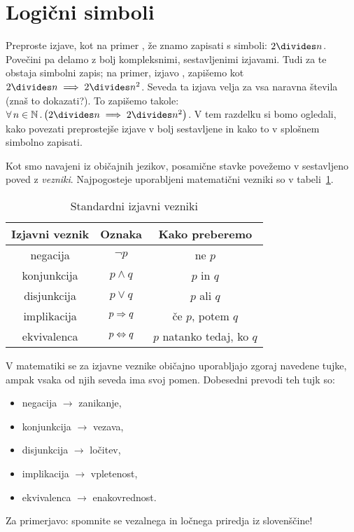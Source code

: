 \section{Logični simboli}\label{razdelek:logicni-simboli}

Preproste izjave, kot na primer , že znamo zapisati s simboli: $2 \divides n$. Povečini pa delamo z bolj kompleksnimi, sestavljenimi izjavami. Tudi za te obstaja simbolni zapis; na primer, izjavo , zapišemo kot $2 \divides n \implies 2 \divides n^2$. Seveda ta izjava velja za vsa naravna števila (znaš to dokazati?). To zapišemo takole: $\all{n}[\NN]{2 \divides n \implies 2 \divides n^2}$. V tem razdelku si bomo ogledali, kako povezati preprostejše izjave v bolj sestavljene in kako to v splošnem simbolno zapisati.

Kot smo navajeni iz običajnih jezikov, posamične stavke povežemo v sestavljeno poved z \emph{vezniki}. Najpogosteje uporabljeni matematični vezniki so v tabeli~\ref{tabela:standardni-izjavni-vezniki}.

\begin{table}[!ht]
\centering
\begin{tabular}{|ccc|}
\hline
\textbf{Izjavni veznik} & \textbf{Oznaka} & \textbf{Kako preberemo} \\
\hline
negacija & $\lnot{p}$ & ne $p$ \\
konjunkcija & $p \land q$ & $p$ in $q$ \\
disjunkcija & $p \lor q$ & $p$ ali $q$ \\
implikacija & $p \Rightarrow q$ & če $p$, potem $q$ \\
ekvivalenca & $p \Leftrightarrow q$ & $p$ natanko tedaj, ko $q$ \\
\hline
\end{tabular}
\caption{Standardni izjavni vezniki}\label{tabela:standardni-izjavni-vezniki}
\end{table}

\begin{opomba}
V matematiki se za izjavne veznike običajno uporabljajo zgoraj navedene tujke, ampak vsaka od njih seveda ima svoj pomen. Dobesedni prevodi teh tujk so:
\begin{itemize}
\item
negacija $\to$ zanikanje,
\item
konjunkcija $\to$ vezava,
\item
disjunkcija $\to$ ločitev,
\item
implikacija $\to$ vpletenost,
\item
ekvivalenca $\to$ enakovrednost.
\end{itemize}
Za primerjavo: spomnite se vezalnega in ločnega priredja iz slovenščine!
\end{opomba}

